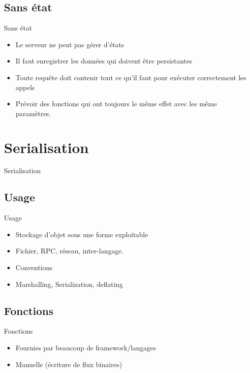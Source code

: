 \begin{frame}{\sectitle}
    \def\subsectitle{Sans état}
    \subsection{\subsectitle}
    \begin{block}{\subsectitle}
        \begin{itemize}
            \item Le serveur ne peut pas gérer d'états
            \item Il faut enregistrer les données qui doivent être persistantes
            \item Toute requête doit contenir tout ce qu'il faut pour exécuter
                correctement les appels
            \item Prévoir des fonctions qui ont toujours le même effet avec les
                même paramètres.
        \end{itemize}
    \end{block}
\end{frame}

\def\sectitle{Serialisation}
\section{\sectitle}
\begin{frame}{\sectitle}
    \def\subsectitle{Usage}
    \subsection{\subsectitle}
    \begin{block}{\subsectitle}
        \begin{itemize}
            \item Stockage d'objet sous une forme exploitable
            \item Fichier, RPC, réseau, inter-langage. 
            \item Conventions
            \item Marshalling, Serialization, deflating
        \end{itemize}
    \end{block}
    \def\subsectitle{Fonctions}
    \subsection{\subsectitle}
    \begin{block}{\subsectitle}
        \begin{itemize}
            \item Fournies par beaucoup de framework/langages 
            \item Manuelle (écriture de flux binaires)
        \end{itemize}
    \end{block}
\end{frame}

